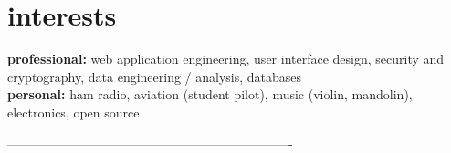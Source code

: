 \documentclass[]{friggeri-cv} %
\begin{document}

\section{interests}

\textbf{professional:} web application engineering, user interface design, security and cryptography, data engineering / analysis, databases
\\ 
\textbf{personal:} ham radio, aviation (student pilot), music (violin, mandolin), electronics, open source

-------------------------------------------------------------------
\end{document}
